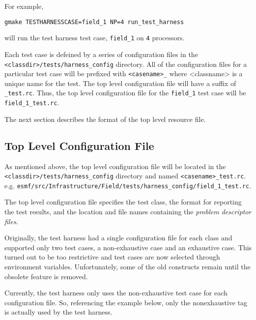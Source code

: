 For example,
\begin{verbatim}
gmake TESTHARNESSCASE=field_1 NP=4 run_test_harness
\end{verbatim}
will run the test harness test case, \texttt{field\_1} on \texttt{4} processors.

Each test case is defeined by a series of configuration files in the
\texttt{<classdir>/tests/harness\_config} directory.  
All of the configuration files for a particular test case will be prefixed with 
\texttt{<casename>\_} where <classname> is a unique name for the test. 
The top level configuration file will have a suffix of \texttt{\_test.rc}.
Thus, the top level configuration file for the \texttt{field\_1} test case will be
\texttt{field\_1\_test.rc}.

The next section describes the format of the top level resource file.

\subsection{Top Level Configuration File}
\label{sec:harness_toplevelfile}
As mentioned above, the top level configuration file will be located in the 
\texttt{<classdir>/tests/harness\_config} directory and named \texttt{<casename>\_test.rc}.
e.g. \texttt{esmf/src/Infrastructure/Field/tests/harness\_config/field\_1\_test.rc}.
 
The top level configuration file specifies the test class, the 
format for reporting the test results, and the location and file names containing 
the \textit{problem descriptor files}. 

Originally, the test harness had a single configuration file for each class and 
supported only two test cases, a non-exhaustive case and an exhaustive case.
This turned out to be too restrictive and test cases are now selected through environment variables.
Unfortunately, some of the old constructs remain until the obsolete feature is removed.

Currently, the test harness only uses the non-exhaustive test case for each configuration file.
So, referencing the example below, only the nonexhaustive tag is actually used by the test harness. 

